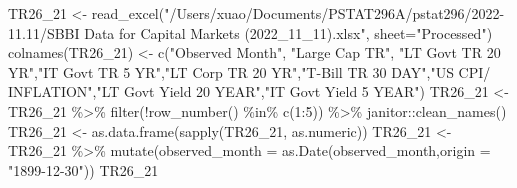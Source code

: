 \documentclass[
]{article}
\newenvironment{Shaded}{\begin{snugshade}}{\end{snugshade}}
\newcommand{\AttributeTok}[1]{\textcolor[rgb]{0.77,0.63,0.00}{#1}}
\newcommand{\DecValTok}[1]{\textcolor[rgb]{0.00,0.00,0.81}{#1}}
\newcommand{\FunctionTok}[1]{\textcolor[rgb]{0.00,0.00,0.00}{#1}}
\newcommand{\NormalTok}[1]{#1}
\newcommand{\OtherTok}[1]{\textcolor[rgb]{0.56,0.35,0.01}{#1}}
\newcommand{\SpecialCharTok}[1]{\textcolor[rgb]{0.00,0.00,0.00}{#1}}
\newcommand{\StringTok}[1]{\textcolor[rgb]{0.31,0.60,0.02}{#1}}
\begin{document}
\begin{Shaded}
\begin{Highlighting}[]
\NormalTok{TR26\_21 }\OtherTok{\textless{}{-}} \FunctionTok{read\_excel}\NormalTok{(}\StringTok{"/Users/xuao/Documents/PSTAT296A/pstat296/2022{-}11.11/SBBI Data for Capital Markets (2022\_11\_11).xlsx"}\NormalTok{, }\AttributeTok{sheet=}\StringTok{"Processed"}\NormalTok{)}
\FunctionTok{colnames}\NormalTok{(TR26\_21) }\OtherTok{\textless{}{-}} \FunctionTok{c}\NormalTok{(}\StringTok{"Observed Month"}\NormalTok{, }\StringTok{"Large Cap TR"}\NormalTok{, }\StringTok{"LT Govt TR 20 YR"}\NormalTok{,}\StringTok{"IT Govt TR 5 YR"}\NormalTok{,}\StringTok{"LT Corp TR 20 YR"}\NormalTok{,}\StringTok{"T{-}Bill TR 30 DAY"}\NormalTok{,}\StringTok{"US CPI/ INFLATION"}\NormalTok{,}\StringTok{"LT Govt Yield 20 YEAR"}\NormalTok{,}\StringTok{"IT Govt Yield 5 YEAR"}\NormalTok{)}
\NormalTok{TR26\_21 }\OtherTok{\textless{}{-}}\NormalTok{ TR26\_21 }\SpecialCharTok{\%\textgreater{}\%}
  \FunctionTok{filter}\NormalTok{(}\SpecialCharTok{!}\FunctionTok{row\_number}\NormalTok{() }\SpecialCharTok{\%in\%} \FunctionTok{c}\NormalTok{(}\DecValTok{1}\SpecialCharTok{:}\DecValTok{5}\NormalTok{)) }\SpecialCharTok{\%\textgreater{}\%}
\NormalTok{  janitor}\SpecialCharTok{::}\FunctionTok{clean\_names}\NormalTok{()}
\NormalTok{TR26\_21 }\OtherTok{\textless{}{-}} \FunctionTok{as.data.frame}\NormalTok{(}\FunctionTok{sapply}\NormalTok{(TR26\_21, as.numeric))}
\NormalTok{TR26\_21 }\OtherTok{\textless{}{-}}\NormalTok{ TR26\_21 }\SpecialCharTok{\%\textgreater{}\%}
  \FunctionTok{mutate}\NormalTok{(}\AttributeTok{observed\_month =} \FunctionTok{as.Date}\NormalTok{(observed\_month,}\AttributeTok{origin =} \StringTok{"1899{-}12{-}30"}\NormalTok{)) }
\NormalTok{TR26\_21}
\end{Highlighting}
\end{Shaded}
\end{document}
